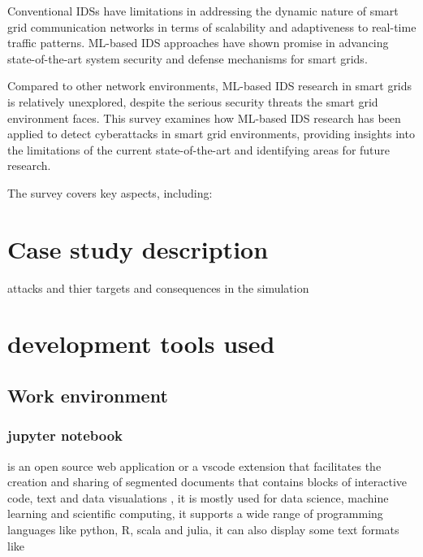 Conventional IDSs have limitations in addressing the dynamic nature of smart grid communication networks in terms of scalability and adaptiveness to real-time traffic patterns. ML-based IDS approaches have shown promise in advancing state-of-the-art system security and defense mechanisms for smart grids.

Compared to other network environments, ML-based IDS research in smart grids is relatively unexplored, despite the serious security threats the smart grid environment faces.
This survey examines how ML-based IDS research has been applied to detect cyberattacks in smart grid environments, providing insights into the limitations of the current state-of-the-art and identifying areas for future research.

The survey covers key aspects, including:




\section{Case study description}
attacks and thier targets and consequences in the simulation



\section{development tools used}
\subsection{Work environment}


\subsubsection{jupyter notebook}
is an open source web application or a vscode extension that facilitates the creation and sharing of segmented documents that contains blocks of interactive code, text and data visualations , it is mostly used for data science, machine learning and scientific computing, it supports a wide range of programming languages like python, R, scala and julia, it can also display some text formats like 


